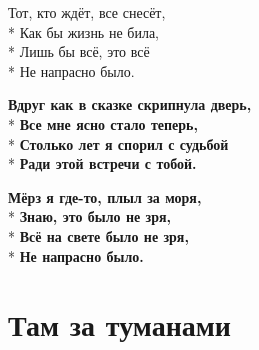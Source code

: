 \medskip

\begin{minipage}{\linewidth}
Тот, кто ждёт, все снесёт,\\*
Как бы жизнь не била,\\*
Лишь бы всё, это всё\\*
Не напрасно было.\\
\end{minipage}\par\medskip\nobreak

\medskip

\begin{minipage}{\linewidth}
\hspace*{1.5em}\textbf{Вдруг как в сказке скрипнула дверь,}\\*
\hspace*{1.5em}\textbf{Все мне ясно стало теперь,}\\*
\hspace*{1.5em}\textbf{Столько лет я спорил с судьбой}\\*
\hspace*{1.5em}\textbf{Ради этой встречи с тобой.}\\
\end{minipage}\par\medskip\nobreak

\medskip

\begin{minipage}{\linewidth}
\hspace*{1.5em}\textbf{Мёрз я где-то, плыл за моря,}\\*
\hspace*{1.5em}\textbf{Знаю, это было не зря,}\\*
\hspace*{1.5em}\textbf{Всё на свете было не зря,}\\*
\hspace*{1.5em}\textbf{Не напрасно было.}\\
\end{minipage}

\vspace{\fill}\newpage

\section{Там за туманами}
\label{song:Там_за_туманами}

